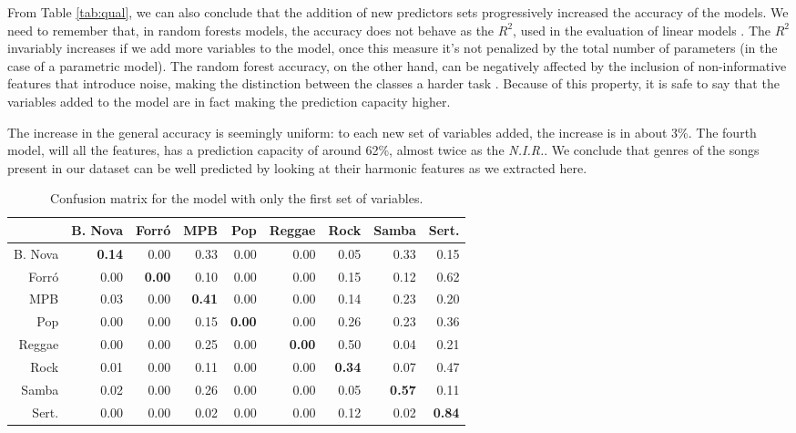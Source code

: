 \documentclass[twocolumn]{article}
\begin{document}
From Table \ref{tab:qual}, we can also conclude
that the addition of new predictors 
sets progressively increased the accuracy
of the models. We need to remember that, in 
random forests models, the accuracy does not
behave as the $R^{2}$, used in the
evaluation of linear models \cite{rsquared}. The
$R^{2}$ invariably increases if we add more
variables to the model, once this measure
it's not penalized by the total number of 
parameters (in the case of a parametric model).
The random forest accuracy, on the other hand, 
can be negatively affected by the inclusion of
non-informative features that introduce noise, 
making the distinction between the classes a 
harder task \cite{Hastie}. 
Because of this property, it is safe to say that 
the variables added to the model are in fact making
the prediction capacity higher. 

The increase in the general accuracy is seemingly
uniform: to each new set of variables added, the 
increase is in about 3\%. The fourth model, will all 
the features, has a prediction capacity of around 62\%,
almost twice as the \textit{N.I.R.}. We conclude 
that genres of the songs present in our dataset can be
well predicted by looking at their harmonic features
as we extracted here. 

\begin{table}[ht]
\caption{Confusion matrix for the model
with only the  first set of variables.}
\small
\vspace{3mm}
 \setlength\tabcolsep{1.5pt}
\centering
\begin{tabular}{rrrrrrrrr}
 & B. Nova & Forró & MPB & Pop & Reggae & Rock & Samba & Sert. \\ 
  \hline
B. Nova   & \textbf{0.14} & 0.00 & 0.33 & 0.00 & 0.00 & 0.05 & 0.33 & 0.15 \\ 
  Forró      & 0.00 & \textbf{0.00} & 0.10 & 0.00 & 0.00 & 0.15 & 0.12 & 0.62 \\ 
  MPB        & 0.03 & 0.00 & \textbf{0.41} & 0.00 & 0.00 & 0.14 & 0.23 & 0.20 \\ 
  Pop        & 0.00 & 0.00 & 0.15 & \textbf{0.00} & 0.00 & 0.26 & 0.23 & 0.36 \\ 
  Reggae     & 0.00 & 0.00 & 0.25 & 0.00 & \textbf{0.00} & 0.50 & 0.04 & 0.21 \\ 
  Rock       & 0.01 & 0.00 & 0.11 & 0.00 & 0.00 & \textbf{0.34} & 0.07 & 0.47 \\ 
  Samba      & 0.02 & 0.00 & 0.26 & 0.00 & 0.00 & 0.05 & \textbf{0.57} & 0.11 \\ 
  Sert.  & 0.00 & 0.00 & 0.02 & 0.00 & 0.00 & 0.12 & 0.02 & \textbf{0.84} \\ 
   \hline
\end{tabular}
\label{tab:conf_1}
\end{table}
\end{document}
